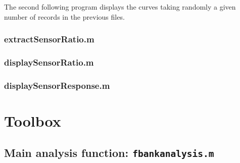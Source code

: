 \documentclass[a4paper, 12pt]{report}
\begin{document}
The second following program displays the curves taking randomly a given number of records in the previous files.

\subsection{extractSensorRatio.m}
{\tiny }

\subsection{displaySensorRatio.m}
{\tiny }


\subsection{displaySensorResponse.m}
{\tiny }

\chapter{Toolbox}
\section{Main analysis function: {\tt fbankanalysis.m}}
{\tiny }
\end{document}
